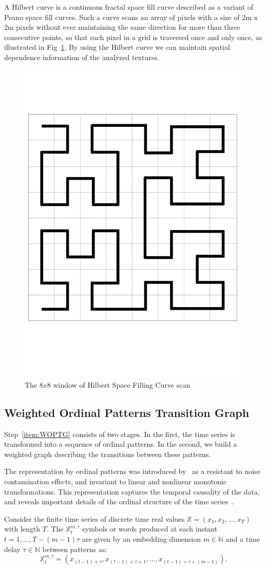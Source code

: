 \documentclass{isprs}
\begin{document}
	
	A Hilbert curve is a continuous fractal space fill curve described as a variant of Peano space fill curves.
	Such a curve scans an array of pixels with a size of 2m x 2m pixels without ever maintaining the same direction for more than three consecutive points, so that each pixel in a grid is traversed once and only once, as illustrated in Fig~\ref{fig:Hilbert}.
	By using the Hilbert curve we can maintain spatial dependence information of the analyzed textures.
	
	\begin{figure}[hbt]
		\centering
		\includegraphics[width=.3\linewidth]{Figures/hilbert.png}
		\caption{The $8 x 8$ window of Hilbert Space Filling Curve scan}
		\label{fig:Hilbert}
	\end{figure}
	
	\subsection{Weighted Ordinal Patterns Transition Graph}\label{WATG}
	
	Step~\ref{item:WOPTG} consists of two stages.
	In the first, the time series is transformed into a sequence of ordinal patterns.
	In the second, we build a weighted graph describing the transitions between these patterns.
	
	The representation by ordinal patterns was introduced by~\cite{Bandt2002Permutation} as a resistant to noise contamination effects, and invariant to linear and nonlinear monotonic transformations.
	This representation captures the temporal causality of the data, and reveals important details of the ordinal structure of the time series~\citep{Larrondo2006Random}.
	
	Consider the finite time series of discrete time real values $\mathbb{X} = (x_1, x_2, \dots, x_T)$ with length $T$.
	The $\mathbb{X}_t^{m, \tau} $ symbols or words produced at each instant $t = 1, \dots, T- (m-1) \tau$ are given by an embedding dimension $m \in \mathbb{N}$ and a time delay $\tau \in \mathbb{N}$ between patterns as:
	\begin{equation}
	\mathbb{X}_t^{m,\tau} = (x_{(t-1)+\tau}, x_{(t-1)+\tau+1},\ldots, x_{(t-1)+\tau+(m-1)}).
	\end{equation}
	
\end{document}
